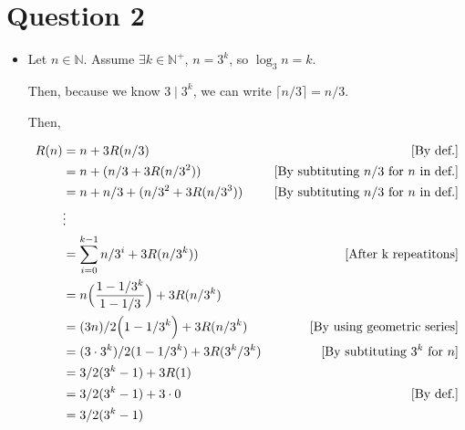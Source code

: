 \documentclass[12pt]{article}
\begin{document}
\section*{Question 2}
\begin{itemize}
    \item

    Let $n \in \mathbb{N}$. Assume $\exists k \in \mathbb{N}^+$, $n = 3^k$, so
    $\log_3 n = k$.

    \bigskip

    Then, because we know $3 \mid 3^k$, we can write $\lceil n/3 \rceil = n/3$.

    \bigskip

    Then,

    \begin{align}
        R(n) &= n + 3R(n/3) & [\text{By def.}]\\
        &= n + (n/3 +3R(n/3^2)) & [\text{By subtituting $n/3$ for $n$ in def.}]\\
        &= n + n/3 + (n/3^2 + 3R(n/3^3)) & [\text{By subtituting $n/3$ for $n$ in def.}]\\
        &\vdots\\
        &= \sum\limits_{i=0}^{k-1} n/3^i + 3R(n/3^k)) & [\text{After k repeatitons}]\\
        &= n \Bigl( \frac{1 - 1/3^k}{1 - 1/3} \Bigr) + 3R(n/3^k)\\
        &= (3n)/2 \Bigl( 1 - 1/3^k \Bigr) + 3R(n/3^k) & [\text{By using geometric series}]\\
        &= (3 \cdot 3^k)/2 ( 1 - 1/3^k) + 3R(3^k/3^k) & [\text{By subtituting $3^k$ for $n$}]\\
        &= 3/2 ( 3^k - 1) + 3R(1)\\
        &= 3/2 ( 3^k - 1) + 3 \cdot 0 & [\text{By def.}]\\
        &= 3/2 ( 3^k - 1)
    \end{align}
\end{itemize}
\end{document}
